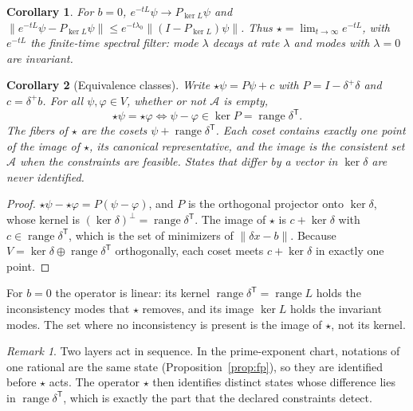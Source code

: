 \documentclass[11pt,letterpaper]{article}
\theoremstyle{plain}
\newtheorem{corollary}{Corollary}
\theoremstyle{definition}
\theoremstyle{remark}
\newtheorem{remark}{Remark}
\newcommand{\norm}[1]{\lVert #1\rVert}
\newcommand{\pinv}{^{+}}
\newcommand{\tr}{^{\mathsf T}}
\begin{document}
\begin{corollary}\label{cor:heat}
For $b=0$, $e^{-tL}\psi\to P_{\ker L}\psi$ and $\norm{e^{-tL}\psi-P_{\ker L}\psi}\le e^{-t\lambda_0}\norm{(I-P_{\ker L})\psi}$. Thus $\star=\lim_{t\to\infty}e^{-tL}$, with $e^{-tL}$ the finite-time spectral filter: mode $\lambda$ decays at rate $\lambda$ and modes with $\lambda=0$ are invariant.
\end{corollary}

\begin{corollary}[Equivalence classes]\label{cor:classes}
Write $\star\psi=P\psi+c$ with $P=I-\delta\pinv\delta$ and $c=\delta\pinv b$. For all $\psi,\varphi\in V$, whether or not $\mathcal{A}$ is empty,
\[
\star\psi=\star\varphi\iff\psi-\varphi\in\ker P=\operatorname{range}\delta\tr .
\]
The fibers of $\star$ are the cosets $\psi+\operatorname{range}\delta\tr$. Each coset contains exactly one point of the image of $\star$, its canonical representative, and the image is the consistent set $\mathcal{A}$ when the constraints are feasible. States that differ by a vector in $\ker\delta$ are never identified.
\end{corollary}

\begin{proof}
$\star\psi-\star\varphi=P(\psi-\varphi)$, and $P$ is the orthogonal projector onto $\ker\delta$, whose kernel is $(\ker\delta)^{\perp}=\operatorname{range}\delta\tr$. The image of $\star$ is $c+\ker\delta$ with $c\in\operatorname{range}\delta\tr$, which is the set of minimizers of $\norm{\delta x-b}$. Because $V=\ker\delta\oplus\operatorname{range}\delta\tr$ orthogonally, each coset meets $c+\ker\delta$ in exactly one point. \qedhere
\end{proof}

For $b=0$ the operator is linear: its kernel $\operatorname{range}\delta\tr=\operatorname{range}L$ holds the inconsistency modes that $\star$ removes, and its image $\ker L$ holds the invariant modes. The set where no inconsistency is present is the image of $\star$, not its kernel.

\begin{remark}
Two layers act in sequence. In the prime-exponent chart, notations of one rational are the same state (Proposition~\ref{prop:fp}), so they are identified before $\star$ acts. The operator $\star$ then identifies distinct states whose difference lies in $\operatorname{range}\delta\tr$, which is exactly the part that the declared constraints detect.
\end{remark}
\end{document}
